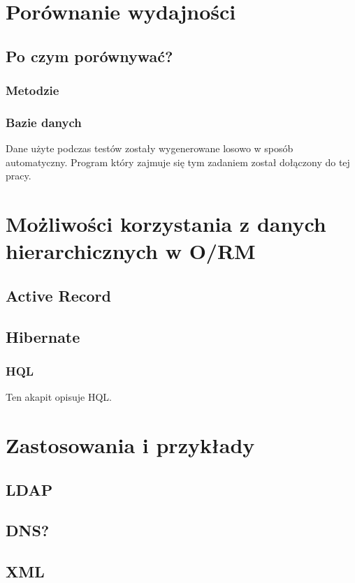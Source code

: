\documentclass[10pt,a4paper,oneside]{book}
\begin{document}
\chapter{Porównanie wydajności}
\section{Po czym porównywać?}
\subsection{Metodzie}
\subsection{Bazie danych}



Dane użyte podczas testów zostały wygenerowane losowo w sposób automatyczny. Program który zajmuje się tym zadaniem został dołączony do tej pracy.

\chapter{Możliwości korzystania z danych hierarchicznych w O/RM}
\section{Active Record}
\section{Hibernate}
\subsection{HQL}

Ten akapit opisuje HQL.

\chapter{Zastosowania i przykłady}

\section{LDAP}
\section{DNS?}
\section{XML}
\end{document}
